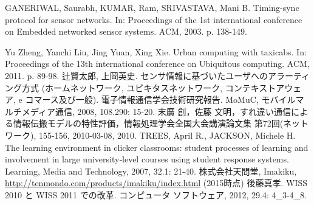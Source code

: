 \begin{thebibliography}{99}

      GANERIWAL, Saurabh, KUMAR, Ram, SRIVASTAVA, Mani B. Timing-sync protocol for sensor networks. In: Proceedings of the 1st international conference on Embedded networked sensor systems. ACM, 2003. p. 138-149.

       Yu Zheng, Yanchi Liu, Jing Yuan, Xing Xie. Urban computing with taxicabs. In: Proceedings of the 13th international conference on Ubiquitous computing. ACM, 2011. p. 89-98.
      辻賢太郎, 上岡英史. センサ情報に基づいたユーザへのアラーティング方式 (ホームネットワーク, ユビキタスネットワーク, コンテキストアウェア, e コマース及び一般). 電子情報通信学会技術研究報告. MoMuC, モバイルマルチメディア通信, 2008, 108.290: 15-20.
  末廣 創，佐藤 文明，すれ違い通信による情報伝搬モデルの特性評価，情報処理学会全国大会講演論文集 第72回(ネットワーク), 155-156, 2010-03-08, 2010.
     TREES, April R., JACKSON, Michele H. The learning environment in clicker classrooms: student processes of learning and involvement in large university‐level courses using student response systems. Learning, Media and Technology, 2007, 32.1: 21-40.
     株式会社天問堂, Imakiku, \url{http://tenmondo.com/products/imakiku/index.html}  (2015時点)
     後藤真孝. WISS 2010 と WISS 2011 での改革. コンピュータ ソフトウェア, 2012, 29.4: 4\_3-4\_8.


\end{thebibliography}

